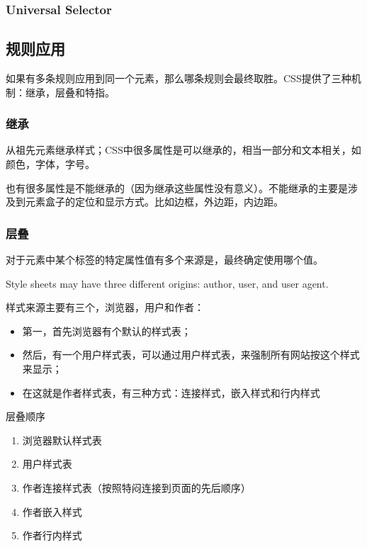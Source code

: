 \subsubsection{Universal Selector}



\subsection{规则应用}

如果有多条规则应用到同一个元素，那么哪条规则会最终取胜。CSS提供了三种机制：继承，层叠和特指。


\subsubsection{继承}

从祖先元素继承样式；CSS中很多属性是可以继承的，相当一部分和文本相关，如颜色，字体，字号。

也有很多属性是不能继承的（因为继承这些属性没有意义）。不能继承的主要是涉及到元素盒子的定位和显示方式。比如边框，外边距，内边距。

\subsubsection{层叠}

对于元素中某个标签的特定属性值有多个来源是，最终确定使用哪个值。

Style sheets may have three different origins: author, user, and user agent.

样式来源主要有三个，浏览器，用户和作者：
\begin{itemize}
\item 第一，首先浏览器有个默认的样式表；
\item 然后，有一个用户样式表，可以通过用户样式表，来强制所有网站按这个样式来显示；
\item 在这就是作者样式表，有三种方式：连接样式，嵌入样式和行内样式
\end{itemize}

层叠顺序
\begin{enumerate}
\item 浏览器默认样式表
\item 用户样式表
\item 作者连接样式表（按照特闷连接到页面的先后顺序）
\item 作者嵌入样式
\item 作者行内样式
\end{enumerate}

